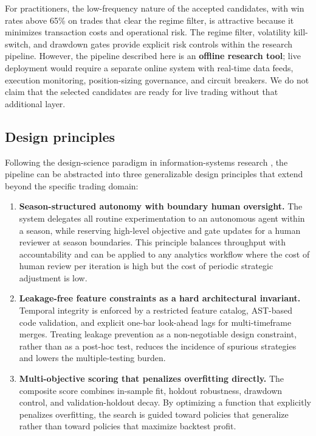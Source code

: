 \documentclass[11pt,a4paper]{article}
\begin{document}
For practitioners, the low-frequency nature of the accepted candidates, with win rates above 65\% on trades that clear the regime filter, is attractive because it minimizes transaction costs and operational risk. The regime filter, volatility kill-switch, and drawdown gates provide explicit risk controls within the research pipeline. However, the pipeline described here is an \textbf{offline research tool}; live deployment would require a separate online system with real-time data feeds, execution monitoring, position-sizing governance, and circuit breakers. We do not claim that the selected candidates are ready for live trading without that additional layer.

\subsection{Design principles}\label{design-principles}

Following the design-science paradigm in information-systems research \citep{hevner_2004}, the pipeline can be abstracted into three generalizable design principles that extend beyond the specific trading domain:

\begin{enumerate}
\def\labelenumi{\arabic{enumi}.}
\item
  \textbf{Season-structured autonomy with boundary human oversight.} The system delegates all routine experimentation to an autonomous agent within a season, while reserving high-level objective and gate updates for a human reviewer at season boundaries. This principle balances throughput with accountability and can be applied to any analytics workflow where the cost of human review per iteration is high but the cost of periodic strategic adjustment is low.
\item
  \textbf{Leakage-free feature constraints as a hard architectural invariant.} Temporal integrity is enforced by a restricted feature catalog, AST-based code validation, and explicit one-bar look-ahead lags for multi-timeframe merges. Treating leakage prevention as a non-negotiable design constraint, rather than as a post-hoc test, reduces the incidence of spurious strategies and lowers the multiple-testing burden.
\item
  \textbf{Multi-objective scoring that penalizes overfitting directly.} The composite score combines in-sample fit, holdout robustness, drawdown control, and validation-holdout decay. By optimizing a function that explicitly penalizes overfitting, the search is guided toward policies that generalize rather than toward policies that maximize backtest profit.
\end{enumerate}
\end{document}
